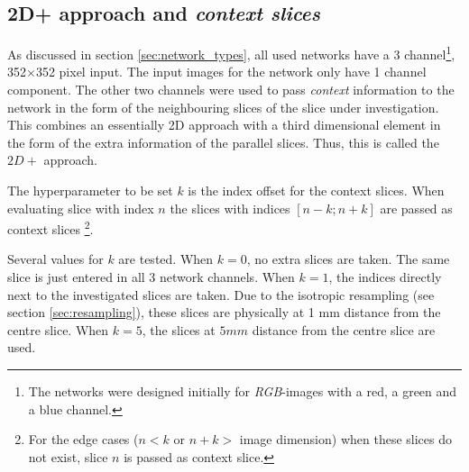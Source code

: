 \subsection{2D+ approach and \textit{context slices}\label{section:twoDplus}}

As discussed in section \ref{sec:network_types}, all used networks have a 3 channel\footnote{The networks were designed initially for \textit{RGB}-images with a red, a green and a blue channel.}, 
352$\times$352 pixel input. 
The input images for the network only have 1 channel component. 
The other two channels were used to pass \textit{context} information to the network in the form of the neighbouring slices of the slice under investigation.
This combines an essentially 2D approach with a third dimensional element in the form of the extra information of the parallel slices. Thus, this is called the $2D+$ approach.


The hyperparameter to be set $k$ is the index offset for the context slices.
When evaluating slice with index $n$ the slices with indices $\left[n-k; n+k\right]$ are passed as context slices
\footnote{For the edge cases ($n<k$ or $n+k>$ image dimension) when these slices do not exist, slice $n$ is passed as context slice.}.


Several values for $k$ are tested. When $k=0$, no extra slices are taken. The same slice is just entered in all 3 network channels. When $k=1$, the indices directly next to the investigated slices are taken.
Due to the isotropic resampling (see section \ref{sec:resampling}), these slices are physically at 1 mm distance from the centre slice. When $k=5$, the slices at $5 mm$ distance from the centre slice are used.

